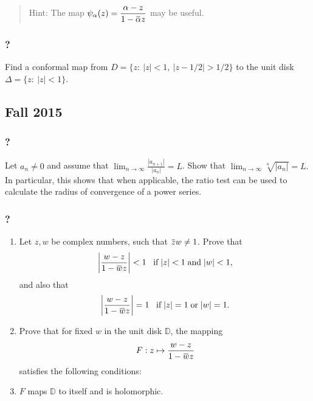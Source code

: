 \begin{quote}
Hint: The map
\(\displaystyle{\psi_{\alpha}(z)=\frac{\alpha-z}{1-\mkern 1.5mu\overline{\mkern-1.5mu\alpha\mkern-1.5mu}\mkern 1.5muz}}\)
may be useful.
\end{quote}

\hypertarget{section-133}{%
\subsubsection{?}\label{section-133}}

Find a conformal map from \(D = \{z :\  |z| < 1,\ |z - 1/2| > 1/2\}\) to
the unit disk \(\Delta=\{z: \ |z|<1\}\).

\hypertarget{fall-2015}{%
\subsection{Fall 2015}\label{fall-2015}}

\hypertarget{section-134}{%
\subsubsection{?}\label{section-134}}

Let \(a_n \neq 0\) and assume that
\(\displaystyle \lim_{n \rightarrow \infty} \frac{|a_{n+1}|}{|a_n|} = L\).
Show that
\(\displaystyle \lim_{n \rightarrow \infty} \sqrt[n]{|a_n|} = L. %
\) In particular, this shows that when applicable, the ratio test can be
used to calculate the radius of convergence of a power series.

\hypertarget{section-135}{%
\subsubsection{?}\label{section-135}}

\begin{enumerate}
\def\labelenumi{(\alph{enumi})}
\item
  Let \(z, w\) be complex numbers, such that
  \(\mkern 1.5mu\overline{\mkern-1.5muz\mkern-1.5mu}\mkern 1.5mu w \neq 1\).
  Prove that
  \begin{align*}{\left\lvert {\frac{w - z}{1 - \mkern 1.5mu\overline{\mkern-1.5muw\mkern-1.5mu}\mkern 1.5mu z}} \right\rvert} < 1 \; \; \; \mbox{if} \; |z| < 1 \; \mbox{and}\; |w| < 1,\end{align*}
  and also that
  \begin{align*}{\left\lvert {\frac{w - z}{1 - \mkern 1.5mu\overline{\mkern-1.5muw\mkern-1.5mu}\mkern 1.5mu z}} \right\rvert} = 1 \; \; \; \mbox{if} \; |z| = 1 \; \mbox{or}\; |w| = 1.\end{align*}
\item
  Prove that for fixed \(w\) in the unit disk \(\mathbb D\), the mapping
  \begin{align*}F: z \mapsto \frac{w - z}{1 - \mkern 1.5mu\overline{\mkern-1.5muw\mkern-1.5mu}\mkern 1.5mu z}\end{align*}
  satisfies the following conditions:
\item
  \(F\) maps \(\mathbb D\) to itself and is holomorphic.~
\end{enumerate}

